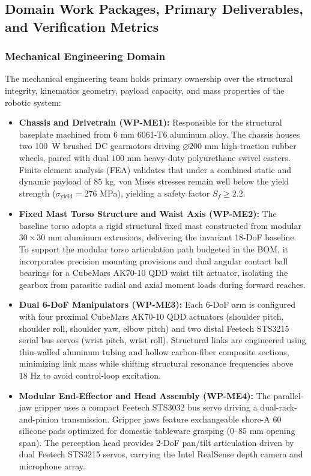\subsection{Domain Work Packages, Primary Deliverables, and Verification Metrics}

\subsubsection{Mechanical Engineering Domain}
The mechanical engineering team holds primary ownership over the structural integrity, kinematics geometry, payload capacity, and mass properties of the robotic system:
\begin{itemize}[leftmargin=1.5em]
  \item \textbf{Chassis and Drivetrain (WP-ME1):} Responsible for the structural baseplate machined from $6\text{ mm}$ 6061-T6 aluminum alloy. The chassis houses two 100~W brushed DC gearmotors driving $\varnothing 200\text{ mm}$ high-traction rubber wheels, paired with dual $100\text{ mm}$ heavy-duty polyurethane swivel casters. Finite element analysis (FEA) validates that under a combined static and dynamic payload of $85\text{ kg}$, von Mises stresses remain well below the yield strength ($\sigma_{\text{yield}} = 276\text{ MPa}$), yielding a safety factor $S_f \ge 2.2$.
  \item \textbf{Fixed Mast Torso Structure and Waist Axis (WP-ME2):} The baseline torso adopts a rigid structural fixed mast constructed from modular $30 \times 30\text{ mm}$ aluminum extrusions, delivering the invariant 18-DoF baseline. To support the modular torso articulation path budgeted in the BOM, it incorporates precision mounting provisions and dual angular contact ball bearings for a CubeMars AK70-10 QDD waist tilt actuator, isolating the gearbox from parasitic radial and axial moment loads during forward reaches.
  \item \textbf{Dual 6-DoF Manipulators (WP-ME3):} Each 6-DoF arm is configured with four proximal CubeMars AK70-10 QDD actuators (shoulder pitch, shoulder roll, shoulder yaw, elbow pitch) and two distal Feetech STS3215 serial bus servos (wrist pitch, wrist roll). Structural links are engineered using thin-walled aluminum tubing and hollow carbon-fiber composite sections, minimizing link mass while shifting structural resonance frequencies above $18\text{ Hz}$ to avoid control-loop excitation.
  \item \textbf{Modular End-Effector and Head Assembly (WP-ME4):} The parallel-jaw gripper uses a compact Feetech STS3032 bus servo driving a dual-rack-and-pinion transmission. Gripper jaws feature exchangeable shore-A 60 silicone pads optimized for domestic tableware grasping ($0\text{--}85\text{ mm}$ opening span). The perception head provides 2-DoF pan/tilt articulation driven by dual Feetech STS3215 servos, carrying the Intel RealSense depth camera and microphone array.

\end{itemize}
